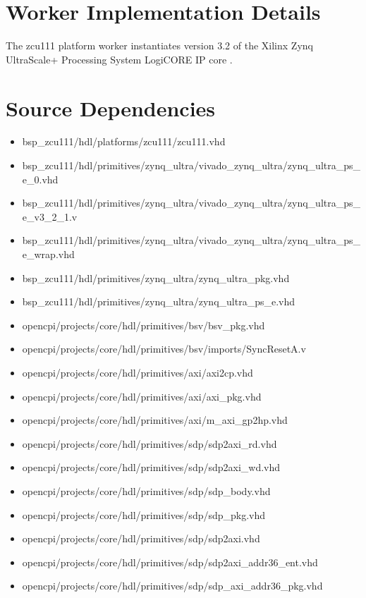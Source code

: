 \documentclass{article}
\def\comp{zcu111}
\begin{document}
\section{Worker Implementation Details}
  The \comp{} platform worker instantiates version 3.2 of the Xilinx Zynq
  UltraScale+ Processing System LogiCORE IP core \cite{xilinx_pg201}.
  \begin{center}
  \end{center}

\section{Source Dependencies}
  \begin{itemize}
    \item bsp\_zcu111/hdl/platforms/zcu111/zcu111.vhd

    \item bsp\_zcu111/hdl/primitives/zynq\_ultra/vivado\_zynq\_ultra/zynq\_ultra\_ps\_e\_0.vhd
    \item bsp\_zcu111/hdl/primitives/zynq\_ultra/vivado\_zynq\_ultra/zynq\_ultra\_ps\_e\_v3\_2\_1.v
    \item bsp\_zcu111/hdl/primitives/zynq\_ultra/vivado\_zynq\_ultra/zynq\_ultra\_ps\_e\_wrap.vhd
    \item bsp\_zcu111/hdl/primitives/zynq\_ultra/zynq\_ultra\_pkg.vhd
    \item bsp\_zcu111/hdl/primitives/zynq\_ultra/zynq\_ultra\_ps\_e.vhd

    \item opencpi/projects/core/hdl/primitives/bsv/bsv\_pkg.vhd
    \item opencpi/projects/core/hdl/primitives/bsv/imports/SyncResetA.v

    \item opencpi/projects/core/hdl/primitives/axi/axi2cp.vhd
    \item opencpi/projects/core/hdl/primitives/axi/axi\_pkg.vhd
    \item opencpi/projects/core/hdl/primitives/axi/m\_axi\_gp2hp.vhd
    \item opencpi/projects/core/hdl/primitives/sdp/sdp2axi\_rd.vhd
    \item opencpi/projects/core/hdl/primitives/sdp/sdp2axi\_wd.vhd
    \item opencpi/projects/core/hdl/primitives/sdp/sdp\_body.vhd
    \item opencpi/projects/core/hdl/primitives/sdp/sdp\_pkg.vhd
    \item opencpi/projects/core/hdl/primitives/sdp/sdp2axi.vhd
    \item opencpi/projects/core/hdl/primitives/sdp/sdp2axi\_addr36\_ent.vhd
    \item opencpi/projects/core/hdl/primitives/sdp/sdp\_axi\_addr36\_pkg.vhd
  \end{itemize}
\end{document}

